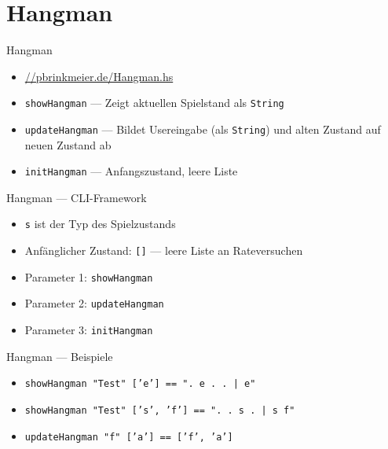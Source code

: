\documentclass{beamer}
\newcommand{\code}[1]{
	\begin{mdframed}
		
	\end{mdframed}
}
\begin{document}
\section{Hangman}

\begin{frame}{Hangman}
	\begin{itemize}
		\item \url{//pbrinkmeier.de/Hangman.hs}
		\item \texttt{showHangman} --- Zeigt aktuellen Spielstand als \texttt{String}
		\item \texttt{updateHangman} --- Bildet Usereingabe (als \texttt{String}) und alten Zustand auf neuen Zustand ab
		\item \texttt{initHangman} --- Anfangszustand, leere Liste
	\end{itemize}
\end{frame}

\begin{frame}{Hangman --- CLI-Framework}
	\code{demos/CLI.hs}

	\begin{itemize}
		\item \texttt{s} ist der Typ des Spielzustands
		\item Anfänglicher Zustand: \texttt{[]} --- leere Liste an Rateversuchen
		\item Parameter 1: \texttt{showHangman}
		\item Parameter 2: \texttt{updateHangman}
		\item Parameter 3: \texttt{initHangman}
	\end{itemize}
\end{frame}

\begin{frame}{Hangman --- Beispiele}
	\begin{itemize}
		\item \texttt{showHangman "Test" ['e'] == ". e . . | e"}
		\item \texttt{showHangman "Test" ['s', 'f'] == ". . s . | s f"}
		\item \texttt{updateHangman "f" ['a'] == ['f', 'a']}
	\end{itemize}
\end{frame}
\end{document}
